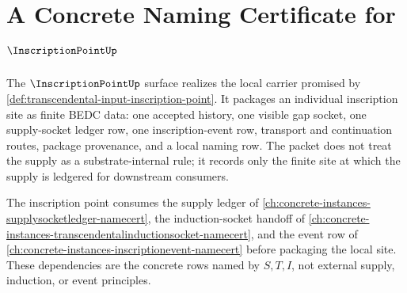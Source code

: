 \chapter{A Concrete Naming Certificate for $\InscriptionPointUp$}
\label{ch:concrete-instances-inscriptionpoint-namecert}

The $\InscriptionPointUp$ surface realizes the local carrier promised by \autoref{def:transcendental-input-inscription-point}. It packages an individual inscription site as finite BEDC data: one accepted history, one visible gap socket, one supply-socket ledger row, one inscription-event row, transport and continuation routes, package provenance, and a local naming row. The packet does not treat the supply as a substrate-internal rule; it records only the finite site at which the supply is ledgered for downstream consumers.

The inscription point consumes the supply ledger of \autoref{ch:concrete-instances-supplysocketledger-namecert}, the induction-socket handoff of \autoref{ch:concrete-instances-transcendentalinductionsocket-namecert}, and the event row of \autoref{ch:concrete-instances-inscriptionevent-namecert} before packaging the local site. These dependencies are the concrete rows named by $S,T,I$, not external supply, induction, or event principles.

